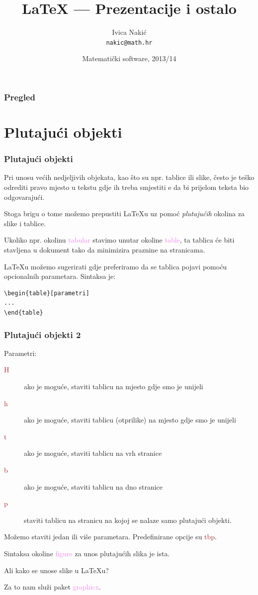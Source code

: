 \documentclass{beamer}
\title{\LaTeX{} --- Prezentacije i ostalo}
\subtitle{}
\author{Ivica Nakić \\ \texttt{nakic@math.hr}}
\institute[PMF--MO]{Matematički odsjek Prirodoslovno--matematičkog fakulteta}
\date[2013/14]{Matematički software, 2013/14}
\theoremstyle{remark}
\theoremstyle{definition}
\begin{document}
\begin{frame}
  \maketitle  
\end{frame}

\begin{frame}
\frametitle{Pregled}
  \tableofcontents  
\end{frame}

\section{Plutajući objekti}

\begin{frame}[fragile]
\frametitle{Plutajući objekti}
Pri unosu većih nedjeljivih objekata, kao što su npr. tablice ili slike, često je teško odrediti pravo mjesto u tekstu gdje ih treba smjestiti e da bi prijelom teksta bio odgovarajući.

Stoga brigu o tome možemo prepustiti \LaTeX{}u uz pomoć \emph{plutajućih} okolina za slike i tablice. 

Ukoliko npr. okolinu \textcolor{violet}{tabular} stavimo unutar okoline \textcolor{violet}{table}, ta tablica će biti stavljena u dokument tako da minimizira praznine na stranicama.

\LaTeX{}u možemo sugerirati gdje preferiramo da se tablica pojavi pomoću opcionalnih parametara. Sintaksa je:
\begin{lstlisting}
\begin{table}[parametri]
...
\end{table}
\end{lstlisting}
\end{frame}

\begin{frame}
\frametitle{Plutajući objekti 2}
Parametri:
\begin{description}
\item[\textcolor{brown}{H}] ako je moguće, staviti tablicu na mjesto gdje smo je unijeli
\item[\textcolor{brown}{h}] ako je moguće, staviti tablicu (otprilike) na mjesto gdje smo je unijeli
\item[\textcolor{brown}{t}] ako je moguće, staviti tablicu na vrh stranice
\item[\textcolor{brown}{b}] ako je moguće, staviti tablicu na dno stranice
\item[\textcolor{brown}{p}] staviti tablicu na stranicu na kojoj se nalaze samo plutajući objekti.
\end{description}
Možemo staviti jedan ili više parametara. Predefinirane opcije su \textcolor{brown}{tbp}.

Sintaksa okoline \textcolor{violet}{figure} za unos plutajućih slika je ista. 

Ali kako se unose slike u \LaTeX u?

Za to nam služi paket \textcolor{violet}{graphicx}. 
\end{frame}
\end{document}
